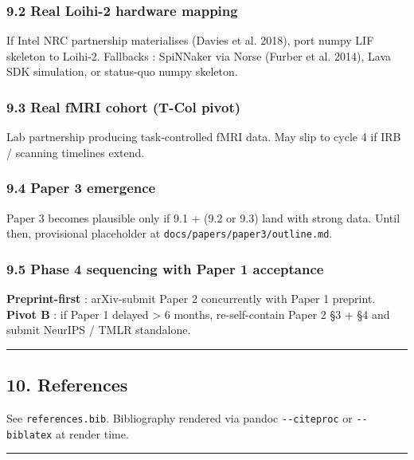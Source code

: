 \documentclass[
]{article}
\begin{document}
\subsubsection{9.2 Real Loihi-2 hardware
mapping}\label{real-loihi-2-hardware-mapping}

If Intel NRC partnership materialises ({Davies et al.} 2018), port numpy
LIF skeleton to Loihi-2. Fallbacks : SpiNNaker via Norse (Furber et al.
2014), Lava SDK simulation, or status-quo numpy skeleton.

\subsubsection{9.3 Real fMRI cohort (T-Col
pivot)}\label{real-fmri-cohort-t-col-pivot}

Lab partnership producing task-controlled fMRI data. May slip to cycle 4
if IRB / scanning timelines extend.

\subsubsection{9.4 Paper 3 emergence}\label{paper-3-emergence}

Paper 3 becomes plausible only if 9.1 + (9.2 or 9.3) land with strong
data. Until then, provisional placeholder at
\texttt{docs/papers/paper3/outline.md}.

\subsubsection{9.5 Phase 4 sequencing with Paper 1
acceptance}\label{phase-4-sequencing-with-paper-1-acceptance}

\textbf{Preprint-first} : arXiv-submit Paper 2 concurrently with Paper 1
preprint. \textbf{Pivot B} : if Paper 1 delayed \textgreater{} 6 months,
re-self-contain Paper 2 §3 + §4 and submit NeurIPS / TMLR standalone.

\begin{center}\rule{0.5\linewidth}{0.5pt}\end{center}

\subsection{10. References}\label{references}

See \texttt{references.bib}. Bibliography rendered via pandoc
\texttt{-\/-citeproc} or \texttt{-\/-biblatex} at render time.

\begin{center}\rule{0.5\linewidth}{0.5pt}\end{center}
\end{document}
